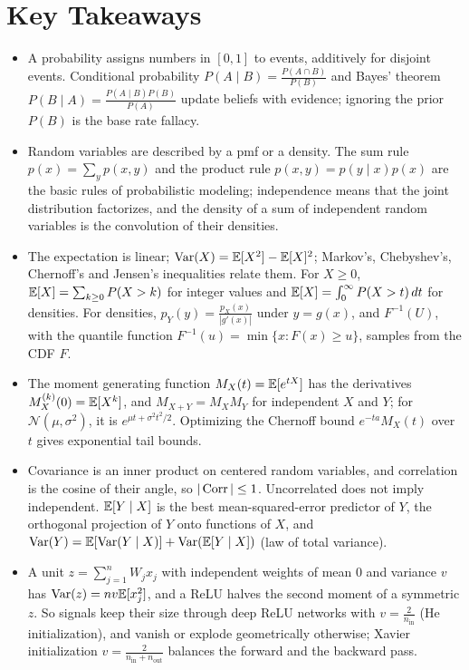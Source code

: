 \section{Key Takeaways}
\begin{itemize}[leftmargin=*]
    \item A probability assigns numbers in $[0, 1]$ to events, additively for disjoint events. Conditional probability $P(A \mid B) = \frac{P(A \cap B)}{P(B)}$ and Bayes' theorem $P(B \mid A) = \frac{P(A \mid B)P(B)}{P(A)}$ update beliefs with evidence; ignoring the prior $P(B)$ is the base rate fallacy.
    \item Random variables are described by a pmf or a density. The sum rule $p(x) = \sum_y p(x, y)$ and the product rule $p(x, y) = p(y \mid x)p(x)$ are the basic rules of probabilistic modeling; independence means that the joint distribution factorizes, and the density of a sum of independent random variables is the convolution of their densities.
    \item The expectation is linear; $\operatorname{Var}(X) = \mathbb{E}[X^2] - \mathbb{E}[X]^2$; Markov's, Chebyshev's, Chernoff's and Jensen's inequalities relate them. For $X \geq 0$, $\mathbb{E}[X] = \sum_{k \geq 0} P(X > k)$ for integer values and $\mathbb{E}[X] = \int_0^\infty P(X > t)\, dt$ for densities. For densities, $p_Y(y) = \frac{p_X(x)}{|g'(x)|}$ under $y = g(x)$, and $F^{-1}(U)$, with the quantile function $F^{-1}(u) = \min\{x : F(x) \geq u\}$, samples from the CDF $F$.
    \item The moment generating function $M_X(t) = \mathbb{E}[e^{tX}]$ has the derivatives $M_X^{(k)}(0) = \mathbb{E}[X^k]$, and $M_{X+Y} = M_XM_Y$ for independent $X$ and $Y$; for $\mathcal{N}(\mu, \sigma^2)$, it is $e^{\mu t + \sigma^2t^2/2}$. Optimizing the Chernoff bound $e^{-ta}M_X(t)$ over $t$ gives exponential tail bounds.
    \item Covariance is an inner product on centered random variables, and correlation is the cosine of their angle, so $|\operatorname{Corr}| \leq 1$. Uncorrelated does not imply independent. $\mathbb{E}[Y \mid X]$ is the best mean-squared-error predictor of $Y$, the orthogonal projection of $Y$ onto functions of $X$, and $\operatorname{Var}(Y) = \mathbb{E}[\operatorname{Var}(Y \mid X)] + \operatorname{Var}(\mathbb{E}[Y \mid X])$ (law of total variance).
    \item A unit $z = \sum_{j=1}^n W_jx_j$ with independent weights of mean $0$ and variance $v$ has $\operatorname{Var}(z) = nv\mathbb{E}[x_j^2]$, and a ReLU halves the second moment of a symmetric $z$. So signals keep their size through deep ReLU networks with $v = \frac{2}{n_{\text{in}}}$ (He initialization), and vanish or explode geometrically otherwise; Xavier initialization $v = \frac{2}{n_{\text{in}} + n_{\text{out}}}$ balances the forward and the backward pass.

\end{itemize}
